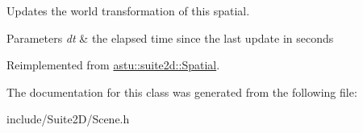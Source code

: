 Updates the world transformation of this spatial.


\begin{DoxyParams}{Parameters}
{\em dt} & the elapsed time since the last update in seconds \\
\hline
\end{DoxyParams}


Reimplemented from \hyperlink{classastu_1_1suite2d_1_1Spatial_a9c612ec47fd9d621aca423822b2b6132}{astu\+::suite2d\+::\+Spatial}.



The documentation for this class was generated from the following file\+:\begin{DoxyCompactItemize}
\item 
include/\+Suite2\+D/Scene.\+h\end{DoxyCompactItemize}
